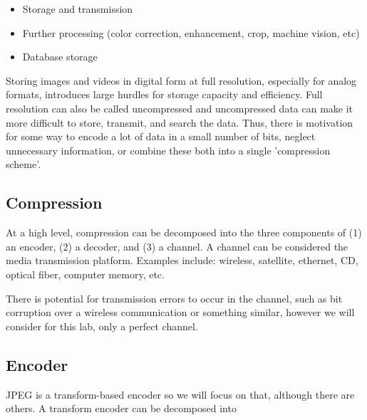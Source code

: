 \documentclass[11pt,a4paper]{article}
\begin{document}
\begin{itemize}
\item Storage and transmission 
\item Further processing (color correction, enhancement, crop, machine vision, etc)
\item Database storage
\end{itemize}

Storing images and videos in digital form at full resolution, especially for analog formats, introduces large hurdles for storage capacity and efficiency. Full resolution can also be called uncompressed and uncompressed data can make it more difficult to store, transmit, and search the data. Thus, there is motivation for some way to encode a lot of data in a small number of bits, neglect unnecessary information, or combine these both into a single 'compression scheme'.

\subsection{Compression}
At a high level, compression can be decomposed into the three components of (1) an encoder, (2) a decoder, and (3) a channel. A channel can be considered the media transmission platform. Examples include: wireless, satellite, ethernet, CD, optical fiber, computer memory, etc.

There is potential for transmission errors to occur in the channel, such as bit corruption over a wireless communication or something similar, however we will consider for this lab, only a perfect channel.

\subsection{Encoder}
JPEG is a transform-based encoder so we will focus on that, although there are others. A transform encoder can be decomposed into
\end{document}
